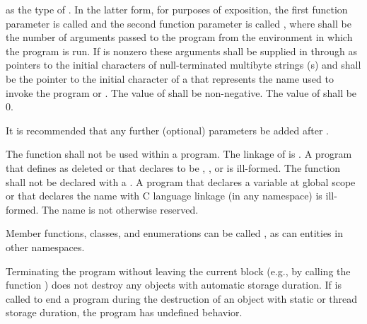 %
%
as the type of .
%
%
In the latter form, for purposes of exposition, the first function
parameter is called  and the second function parameter is
called , where  shall be the number of
arguments passed to the program from the environment in which the
program is run. If
 is nonzero these arguments shall be supplied in
 through  as pointers to the initial
characters of null-terminated multibyte strings (\ntmbs{}s)
and  shall be the pointer to
the initial character of a \ntmbs{} that represents the name used to
invoke the program or . The value of  shall be
non-negative. The value of  shall be 0. \begin{note} It
is recommended that any further (optional) parameters be added after
. \end{note}

\pnum
The function  shall not be used within
a program.
%
The linkage of  is
. A program that defines  as
deleted or that declares  to be
, , or  is ill-formed.
The  function shall not be declared with a
.  A program that
declares a variable  at global scope or that declares the name
 with C language linkage (in any namespace) is ill-formed.
The name  is
not otherwise reserved. \begin{example} Member functions, classes, and
enumerations can be called , as can entities in other
namespaces. \end{example}

\pnum
{}%
%
%
Terminating the program
without leaving the current block (e.g., by calling the function
) does not destroy any
objects with automatic storage duration. If
 is called to end a program during the destruction of
an object with static or thread storage duration, the program has undefined
behavior.

